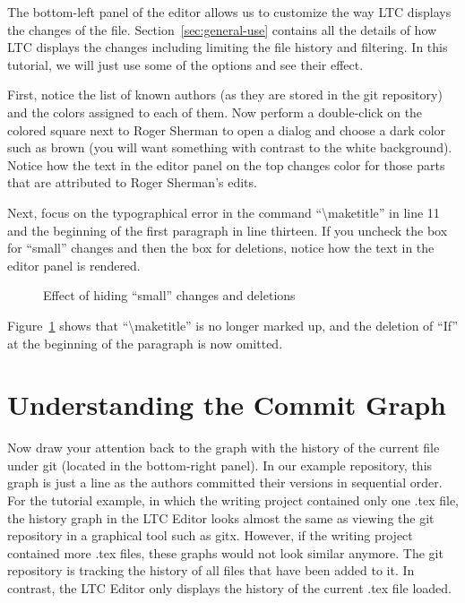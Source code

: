 The bottom-left panel of the editor allows us to customize the way LTC displays the changes of the file.  Section~\ref{sec:general-use} contains all the details of how LTC displays the changes including limiting the file history and filtering.  In this tutorial, we will just use some of the options and see their effect.

First, notice the list of known authors (as they are stored in the git repository) and the colors assigned to each of them.  Now perform a double-click on the colored square next to Roger Sherman to open a dialog and  choose a dark color such as brown (you will want something with contrast to the white background).  Notice how the text in the editor panel on the top changes color for those parts that are attributed to Roger Sherman's edits.

Next, focus on the typographical error in the command ``\textbackslash maketitle'' in line 11 and the beginning of the first paragraph in line thirteen.  If you uncheck the box for ``small'' changes and then the box for deletions, notice how the text in the editor panel is rendered.
\begin{figure}[t]
\centering
{}
\hspace{2ex}
\hspace{2ex}
\caption{Effect of hiding ``small'' changes and deletions} \label{fig:editor-filter-small}
\end{figure}
Figure~\ref{fig:editor-filter-small} shows that ``\textbackslash maketitle'' is no longer marked up, and the deletion of ``If'' at the beginning of the paragraph is now omitted.

\section{Understanding the Commit Graph}

Now draw your attention back to the graph with the history of the current file under git (located in the bottom-right panel).  In our example repository, this graph is just a line as the authors committed their versions in sequential order.  For the tutorial example, in which the writing project contained only one .tex file, the history graph in the LTC Editor looks almost the same as viewing the git repository in a graphical tool such as gitx.  However, if the writing project contained more .tex files, these graphs would not look similar anymore.  The git repository is tracking the history of all files that have been added to it.  In contrast, the LTC Editor only displays the history of the current .tex file loaded.

